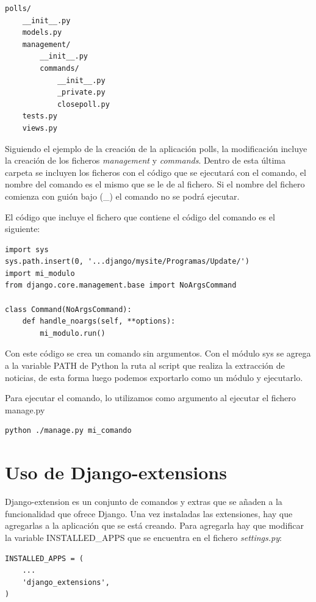 \begin{lstlisting}
polls/
    __init__.py
    models.py
    management/
        __init__.py
        commands/
            __init__.py
            _private.py
            closepoll.py
    tests.py
    views.py
\end{lstlisting}

Siguiendo el ejemplo de la creación de la aplicación polls, la modificación incluye la creación de los ficheros \textit{management} y \textit{commands}. Dentro de esta última carpeta se incluyen los ficheros con el código que se ejecutará con el comando, el nombre del comando es el mismo que se le de al fichero. Si el nombre del fichero comienza con guión bajo (\_) el comando no se podrá ejecutar.

El código que incluye el fichero que contiene el código del comando es el siguiente:

\begin{lstlisting}
import sys
sys.path.insert(0, '...django/mysite/Programas/Update/')
import mi_modulo
from django.core.management.base import NoArgsCommand

class Command(NoArgsCommand):
    def handle_noargs(self, **options):
		mi_modulo.run()

\end{lstlisting}

Con este código se crea un comando sin argumentos. Con el módulo sys se agrega a la variable PATH de Python la ruta al script que realiza la extracción de noticias, de esta forma luego podemos exportarlo como un módulo y ejecutarlo.

Para ejecutar el comando, lo utilizamos como argumento al ejecutar el fichero manage.py


\begin{lstlisting}
python ./manage.py mi_comando
\end{lstlisting}
\section{Uso de Django-extensions}
Django-extension es un conjunto de comandos y extras que se añaden a la funcionalidad que ofrece Django. Una vez instaladas las extensiones, hay que agregarlas a la aplicación que se está creando. Para agregarla hay que modificar la variable INSTALLED\_APPS que se encuentra en el fichero \textit{settings.py}:

\begin{lstlisting}
INSTALLED_APPS = (
    ...
    'django_extensions',
)
\end{lstlisting}

